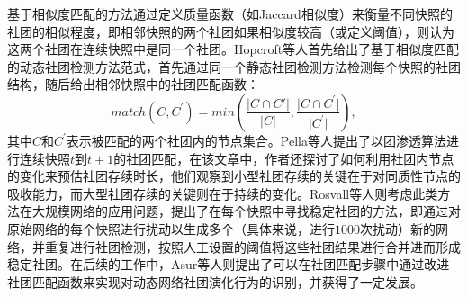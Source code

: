 
基于相似度匹配的方法通过定义质量函数（如Jaccard相似度）来衡量不同快照的社团的相似程度，即相邻快照的两个社团如果相似度较高（或定义阈值），则认为这两个社团在连续快照中是同一个社团。Hopcroft等人\cite{hopcroft2004tracking}首先给出了基于相似度匹配的动态社团检测方法范式，首先通过同一个静态社团检测方法检测每个快照的社团结构，随后给出相邻快照中的社团匹配函数：
\begin{equation}
    match(C,C^{'})=min(\frac{\lvert C \cap C{'} \rvert}{\lvert C \rvert},\frac{\lvert C \cap C^{'} \rvert}{\lvert C^{'} \rvert}),
\end{equation}
其中$C$和$C^{'}$表示被匹配的两个社团内的节点集合。Pella等人\cite{palla2007quantifying}提出了以团渗透算法进行连续快照$t$到$t+1$的社团匹配，在该文章中，作者还探讨了如何利用社团内节点的变化来预估社团存续时长，他们观察到小型社团存续的关键在于对同质性节点的吸收能力，而大型社团存续的关键则在于持续的变化。Rosvall等人\cite{rosvall2010mapping}则考虑此类方法在大规模网络的应用问题，提出了在每个快照中寻找稳定社团的方法，即通过对原始网络的每个快照进行扰动以生成多个（具体来说，进行$1000$次扰动）新的网络，并重复进行社团检测，按照人工设置的阈值将这些社团结果进行合并进而形成稳定社团。在后续的工作中，Asur等人\cite{asur2009event}则提出了可以在社团匹配步骤中通过改进社团匹配函数来实现对动态网络社团演化行为的识别，并获得了一定发展\cite{bota2011dynamic}。

